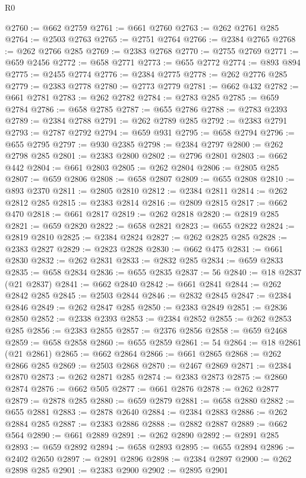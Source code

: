 \begin{lexlean}{R0}
\begin{coremodule}
@2760 := @662 @2759
@2761 := @661 @2760
@2763 := @262 @2761 @285
@2764 := @2503 @2763
@2765 := @2751 @2764
@2766 := @2384 @2765
@2768 := @262 @2766 @285
@2769 := @2383 @2768
@2770 := @2755 @2769
@2771 := @659 @2456
@2772 := @658 @2771
@2773 := @655 @2772
@2774 := @893 @894
@2775 := @2455 @2774
@2776 := @2384 @2775
@2778 := @262 @2776 @285
@2779 := @2383 @2778
@2780 := @2773 @2779
@2781 := @662 @432
@2782 := @661 @2781
@2783 := @262 @2782
@2784 := @2783 @285
@2785 := @659 @2784
@2786 := @658 @2785
@2787 := @655 @2786
@2788 := @2783 @2393
@2789 := @2384 @2788
@2791 := @262 @2789 @285
@2792 := @2383 @2791
@2793 := @2787 @2792
@2794 := @659 @931
@2795 := @658 @2794
@2796 := @655 @2795
@2797 := @930 @2385
@2798 := @2384 @2797
@2800 := @262 @2798 @285
@2801 := @2383 @2800
@2802 := @2796 @2801
@2803 := @662 @442
@2804 := @661 @2803
@2805 := @262 @2804
@2806 := @2805 @285
@2807 := @659 @2806
@2808 := @658 @2807
@2809 := @655 @2808
@2810 := @893 @2370
@2811 := @2805 @2810
@2812 := @2384 @2811
@2814 := @262 @2812 @285
@2815 := @2383 @2814
@2816 := @2809 @2815
@2817 := @662 @470
@2818 := @661 @2817
@2819 := @262 @2818
@2820 := @2819 @285
@2821 := @659 @2820
@2822 := @658 @2821
@2823 := @655 @2822
@2824 := @2819 @2810
@2825 := @2384 @2824
@2827 := @262 @2825 @285
@2828 := @2383 @2827
@2829 := @2823 @2828
@2830 := @662 @475
@2831 := @661 @2830
@2832 := @262 @2831
@2833 := @2832 @285
@2834 := @659 @2833
@2835 := @658 @2834
@2836 := @655 @2835
@2837 := 56
@2840 := @18 @2837 (@21 @2837)
@2841 := @662 @2840
@2842 := @661 @2841
@2844 := @262 @2842 @285
@2845 := @2503 @2844
@2846 := @2832 @2845
@2847 := @2384 @2846
@2849 := @262 @2847 @285
@2850 := @2383 @2849
@2851 := @2836 @2850
@2852 := @2338 @2393
@2853 := @2384 @2852
@2855 := @262 @2853 @285
@2856 := @2383 @2855
@2857 := @2376 @2856
@2858 := @659 @2468
@2859 := @658 @2858
@2860 := @655 @2859
@2861 := 54
@2864 := @18 @2861 (@21 @2861)
@2865 := @662 @2864
@2866 := @661 @2865
@2868 := @262 @2866 @285
@2869 := @2503 @2868
@2870 := @2467 @2869
@2871 := @2384 @2870
@2873 := @262 @2871 @285
@2874 := @2383 @2873
@2875 := @2860 @2874
@2876 := @662 @505
@2877 := @661 @2876
@2878 := @262 @2877
@2879 := @2878 @285
@2880 := @659 @2879
@2881 := @658 @2880
@2882 := @655 @2881
@2883 := @2878 @2640
@2884 := @2384 @2883
@2886 := @262 @2884 @285
@2887 := @2383 @2886
@2888 := @2882 @2887
@2889 := @662 @564
@2890 := @661 @2889
@2891 := @262 @2890
@2892 := @2891 @285
@2893 := @659 @2892
@2894 := @658 @2893
@2895 := @655 @2894
@2896 := @2402 @2650
@2897 := @2891 @2896
@2898 := @2384 @2897
@2900 := @262 @2898 @285
@2901 := @2383 @2900
@2902 := @2895 @2901

\end{coremodule}
\end{lexlean}
